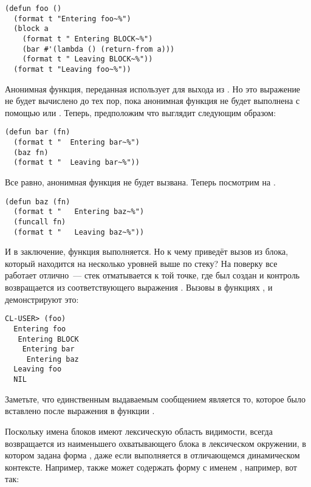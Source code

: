 \begin{lstlisting}
(defun foo ()
  (format t "Entering foo~%")
  (block a
    (format t " Entering BLOCK~%")
    (bar #'(lambda () (return-from a)))
    (format t " Leaving BLOCK~%"))
  (format t "Leaving foo~%"))
\end{lstlisting}

Анонимная функция, переданная  использует  для выхода из
. Но это выражение  не будет вычислено до тех пор, пока
анонимная функция не будет выполнена с помощью  или . Теперь,
предположим что  выглядит следующим образом:

\begin{lstlisting}
(defun bar (fn)
  (format t "  Entering bar~%")
  (baz fn)
  (format t "  Leaving bar~%"))
\end{lstlisting}

Все равно, анонимная функция не будет вызвана. Теперь посмотрим на .

\begin{lstlisting}
(defun baz (fn)
  (format t "   Entering baz~%")
  (funcall fn)
  (format t "   Leaving baz~%"))
\end{lstlisting}

И в заключение, функция выполняется. Но к чему приведёт вызов  из блока,
который находится на несколько уровней выше по стеку? На поверку все работает отлично~---
стек отматывается к той точке, где  был создан и контроль возвращается из
соответствующего выражения . Вызовы  в функциях ,
 и  демонстрируют это:

\begin{lstlisting}[style=lisprepl]
  CL-USER> (foo)
  Entering foo
   Entering BLOCK
    Entering bar
     Entering baz
  Leaving foo
  NIL
\end{lstlisting}

Заметьте, что единственным выдаваемым сообщением  является то, которое
было вставлено после выражения  в функции .

Поскольку имена блоков имеют лексическую область видимости,  всегда
возвращается из наименьшего охватывающего блока  в лексическом окружении, в
котором задана форма , даже если  выполняется в
отличающемся динамическом контексте. Например,  также может содержать форму
 с именем , например, вот так:

